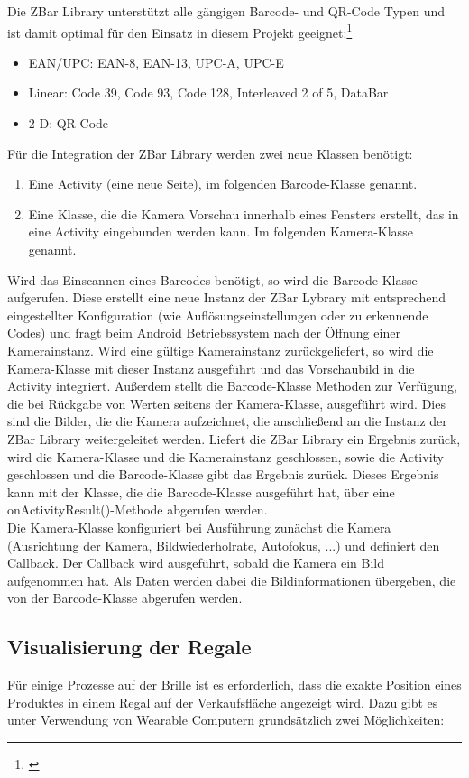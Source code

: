 Die ZBar Library unterstützt alle gängigen Barcode- und QR-Code Typen und ist damit optimal für den Einsatz in diesem Projekt geeignet:\footnote{\citep{zbar}}
\begin{itemize}
	\item EAN/UPC: EAN-8, EAN-13, UPC-A, UPC-E
	\item Linear: Code 39, Code 93, Code 128, Interleaved 2 of 5, DataBar
	\item 2-D: QR-Code
\end{itemize}

Für die Integration der ZBar Library werden zwei neue Klassen benötigt:
\begin{enumerate}
	\item Eine Activity (eine neue Seite), im folgenden Barcode-Klasse genannt.
	\item Eine Klasse, die die Kamera Vorschau innerhalb eines Fensters erstellt, das in eine Activity eingebunden werden kann. Im folgenden Kamera-Klasse genannt.
\end{enumerate} 
Wird das Einscannen eines Barcodes benötigt, so wird die Barcode-Klasse aufgerufen. Diese erstellt eine neue Instanz der ZBar Lybrary mit entsprechend eingestellter Konfiguration (wie \zB Auflösungseinstellungen oder zu erkennende Codes) und fragt beim Android Betriebssystem nach der Öffnung einer Kamerainstanz. Wird eine gültige Kamerainstanz zurückgeliefert, so wird die Kamera-Klasse mit dieser Instanz ausgeführt und das Vorschaubild in die Activity integriert. Außerdem stellt die Barcode-Klasse Methoden zur Verfügung, die bei Rückgabe von Werten seitens der Kamera-Klasse, ausgeführt wird. Dies sind die Bilder, die die Kamera aufzeichnet, die anschließend an die Instanz der ZBar Library weitergeleitet werden. Liefert die ZBar Library ein Ergebnis zurück, wird die Kamera-Klasse und die Kamerainstanz geschlossen, sowie die Activity geschlossen und die Barcode-Klasse gibt das Ergebnis zurück. Dieses Ergebnis kann mit der Klasse, die die Barcode-Klasse ausgeführt hat, über eine onActivityResult()-Methode abgerufen werden.\\

Die Kamera-Klasse konfiguriert bei Ausführung zunächst die Kamera (Ausrichtung der Kamera, Bildwiederholrate, Autofokus, ...) und definiert den Callback. Der Callback wird ausgeführt, sobald die Kamera ein Bild aufgenommen hat. Als Daten werden dabei die Bildinformationen übergeben, die von der Barcode-Klasse abgerufen werden.

\subsection{Visualisierung der Regale}
Für einige Prozesse auf der Brille ist es erforderlich, dass die exakte Position eines Produktes in einem Regal auf der Verkaufsfläche angezeigt wird. Dazu gibt es unter Verwendung von Wearable Computern grundsätzlich zwei Möglichkeiten:

